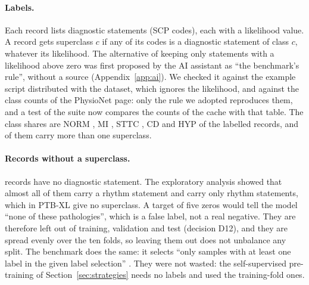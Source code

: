 \paragraph{Labels.} Each record lists diagnostic statements (SCP codes), each with a likelihood value.
A record gets superclass $c$ if any of its codes is a diagnostic statement of class $c$, whatever its
likelihood. The alternative of keeping only statements with a likelihood above zero was first proposed
by the AI assistant as ``the benchmark's rule'', without a source (Appendix~\ref{app:ai}). We checked it
against the example script distributed with the dataset, which ignores the likelihood, and against the
class counts of the PhysioNet page: only the rule we adopted reproduces them, and a test of the suite now
compares the counts of the cache with that table. The class shares are NORM \edaPrevAllNORMPct{}, MI
\edaPrevAllMIPct{}, STTC \edaPrevAllSTTCPct{}, CD \edaPrevAllCDPct{} and HYP \edaPrevAllHYPPct{} of the
labelled records, and \edaFracMultilabelAllPct{} of them carry more than one superclass.

\paragraph{Records without a superclass.} \edaNNosuperAll{} records have no diagnostic statement.
The exploratory analysis showed that almost all of them carry a rhythm statement and
\edaNNosuperRhythmOnly{} carry only rhythm statements, which in PTB-XL give no superclass. A target of
five zeros would tell the model ``none of these pathologies'', which is a false label, not a real
negative. They are therefore left out of training, validation and test (decision D12), and they are
spread evenly over the ten folds, so leaving them out does not unbalance any split. The benchmark does
the same: it selects ``only samples with at least one label in the given label selection''
\cite[p.~1523]{strodthoff2021deep}. They were not wasted: the self-supervised pre-training of
Section~\ref{sec:strategies} needs no labels and used the training-fold ones.

